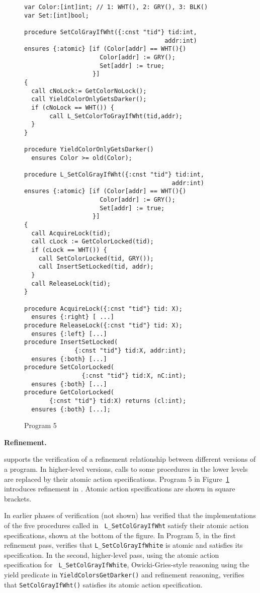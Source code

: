 \begin{figure}
\begin{verbatim}
var Color:[int]int; // 1: WHT(), 2: GRY(), 3: BLK()
var Set:[int]bool;

procedure SetColGrayIfWht({:cnst "tid"} tid:int,
                                       addr:int)
ensures {:atomic} [if (Color[addr] == WHT(){)
                     Color[addr] := GRY();
                     Set[addr] := true;
                   }]
{
  call cNoLock:= GetColorNoLock();
  call YieldColorOnlyGetsDarker();
  if (cNoLock == WHT()) {
       call L_SetColorToGrayIfWht(tid,addr);
  }
}

procedure YieldColorOnlyGetsDarker()
  ensures Color >= old(Color);

procedure L_SetColGrayIfWht({:cnst "tid"} tid:int,
                                         addr:int)
ensures {:atomic} [if (Color[addr] == WHT(){)
                     Color[addr] := GRY();
                     Set[addr] := true;
                   }]
{
  call AcquireLock(tid);
  call cLock := GetColorLocked(tid);
  if (cLock == WHT()) {
    call SetColorLocked(tid, GRY());
    call InsertSetLocked(tid, addr);
  } 
  call ReleaseLock(tid);
}

procedure AcquireLock({:cnst "tid"} tid: X);
  ensures {:right} [ ...]
procedure ReleaseLock({:cnst "tid"} tid: X);
  ensures {:left} [...]
procedure InsertSetLocked(
              {:cnst "tid"} tid:X, addr:int); 
  ensures {:both} [...]
procedure SetColorLocked(
                {:cnst "tid"} tid:X, nC:int); 
  ensures {:both} [...]
procedure GetColorLocked(
       {:cnst "tid"} tid:X) returns (cl:int);
  ensures {:both} [...];

\end{verbatim}
\caption{Program 5}
\label{fig:reft}
\end{figure}

{\bf Refinement.} 

\civl supports the
verification of a refinement relationship between different versions of a
program. In higher-level versions, calls to some procedures in the
lower levels are
replaced by their atomic action specifications. 
Program 5 in Figure~\ref{fig:reft} introduces refinement in \civl. 
Atomic action specifications are shown in square brackets. 

In earlier phases of verification (not shown) \civl has verified that
the implementations of the five procedures called in {\tt
  L\_SetColGrayIfWht} satisfy their atomic action specifications, shown
at the bottom of the figure. In Program 5, in the first refinement
pass, \civl verifies that {\tt L\_SetColGrayIfWhite} is atomic and
satisfies its specification. In the second, higher-level 
pass, using the atomic action specification for {\tt
  L\_SetColGrayIfWhite}, Owicki-Gries-style reasoning using the yield
predicate in {\tt YieldColorsGetDarker()} and refinement reasoning, \civl verifies
that {\tt SetColGrayIfWht()} satisfies its atomic action
specification. 

